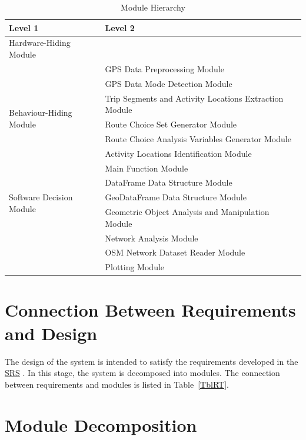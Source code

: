 \documentclass[12pt, titlepage]{article}
\begin{document}
\begin{table}[h!]
\centering
\begin{tabular}{p{} p{}}
\toprule
\textbf{Level 1} & \textbf{Level 2}\\
\midrule

{Hardware-Hiding Module} & ~ \\
\midrule

\multirow{7}{0.3\textwidth}{Behaviour-Hiding Module}
& GPS Data Preprocessing Module\\
& GPS Data Mode Detection Module \\
& Trip Segments and Activity Locations Extraction Module\\
& Route Choice Set Generator Module\\
& Route Choice Analysis Variables Generator Module\\
& Activity Locations Identification Module\\
& Main Function Module\\ 
\midrule

\multirow{3}{0.3\textwidth}{Software Decision Module}
& DataFrame Data Structure Module\\
& GeoDataFrame Data Structure Module\\
& Geometric Object Analysis and Manipulation Module\\
& Network Analysis Module\\
& OSM Network Dataset Reader Module\\
& Plotting Module\\
\bottomrule

\end{tabular}
\caption{Module Hierarchy}
\label{TblMH}
\end{table}

\section{Connection Between Requirements and Design} \label{SecConnection}

The design of the system is intended to satisfy the requirements developed in
the \href{https://github.com/paezha/PyERT-BLACK/blob/main/docs/SRS/SRS.pdf}{SRS} \citep{SRS}. In this stage, the system is decomposed into modules. The connection
between requirements and modules is listed in Table~\ref{TblRT}.

\section{Module Decomposition} \label{SecMD}
\end{document}
